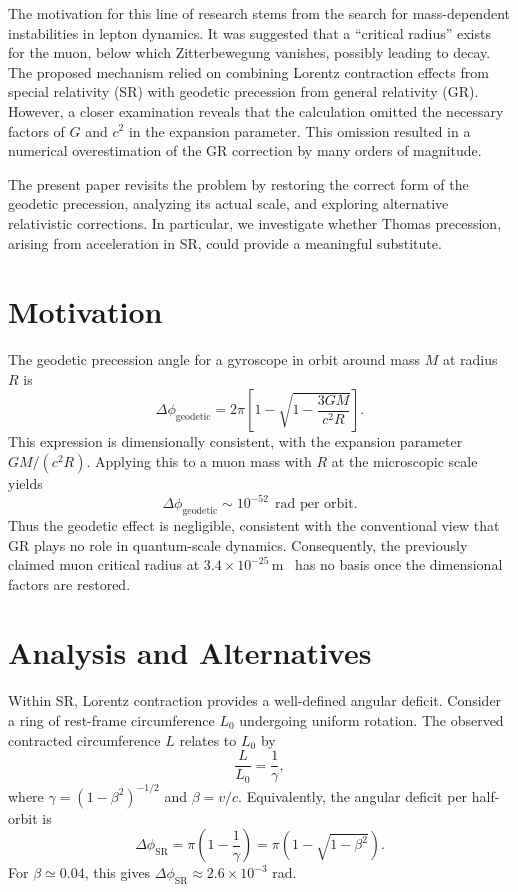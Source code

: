 \documentclass[%
 reprint,
 amsmath,amssymb,
 aps,
]{revtex4-1}
\numberwithin{equation}{section}%
\begin{document}
The motivation for this line of research stems from the search for mass-dependent instabilities in lepton dynamics. It was suggested that a ``critical radius'' exists for the muon, below which Zitterbewegung vanishes, possibly leading to decay. The proposed mechanism relied on combining Lorentz contraction effects from special relativity (SR) with geodetic precession from general relativity (GR). However, a closer examination reveals that the calculation omitted the necessary factors of $G$ and $c^2$ in the expansion parameter. This omission resulted in a numerical overestimation of the GR correction by many orders of magnitude.

The present paper revisits the problem by restoring the correct form of the geodetic precession, analyzing its actual scale, and exploring alternative relativistic corrections. 
In particular, we investigate whether Thomas precession, arising from acceleration in SR, 
could provide a meaningful substitute.


\section{Motivation}\label{sec:motivation}

The geodetic precession angle for a gyroscope in orbit around mass $M$ at radius $R$ is
\begin{equation}
\Delta \phi_{\mathrm{geodetic}} = 2\pi \left[ 1 - \sqrt{1-\frac{3GM}{c^2R}} \right].
\label{eq:geodetic_full}
\end{equation}
This expression is dimensionally consistent, with the expansion parameter $GM/(c^2R)$. 
Applying this to a muon mass with $R$ at the microscopic scale yields
\begin{equation}
\Delta \phi_{\mathrm{geodetic}} \sim 10^{-52} \ \ \text{rad per orbit}.
\end{equation}
Thus the geodetic effect is negligible, consistent with the conventional view that GR plays no role in quantum-scale dynamics. 
Consequently, the previously claimed muon critical radius at $3.4 \times 10^{-25}\,\mathrm{m}$~\cite{zenodo.16905633} 
has no basis once the dimensional factors are restored.

\section{Analysis and Alternatives}

Within SR, Lorentz contraction provides a well-defined angular deficit. 
Consider a ring of rest-frame circumference $L_0$ undergoing uniform rotation. 
The observed contracted circumference $L$ relates to $L_0$ by 
\begin{equation}
\frac{L}{L_0} = \frac{1}{\gamma},
\end{equation}
where $\gamma=(1-\beta^2)^{-1/2}$ and $\beta=v/c$. 
Equivalently, the angular deficit per half-orbit is
\begin{equation}
\Delta \phi_{\mathrm{SR}} = \pi \left(1-\frac{1}{\gamma}\right) = \pi \left(1-\sqrt{1-\beta^2}\right).
\end{equation}
For $\beta\simeq 0.04$, this gives $\Delta \phi_{\mathrm{SR}}\approx 2.6\times 10^{-3}$ rad.
\end{document}
